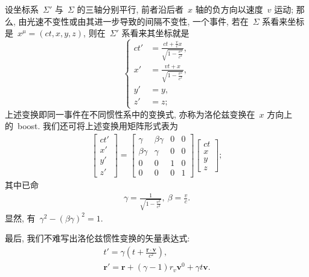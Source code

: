 设坐标系~$\Sigma'$ 与~$\Sigma$ 的三轴分别平行, 前者沿后者~$x$ 轴的负方向以速度~$v$ 运动; 那么, 由光速不变性或由其进一步导致的间隔不变性, 一个事件, 若在~$\Sigma$ 系看来坐标是~$x^\mu=(ct, x, y, z)$, 则在~$\Sigma'$ 系看来其坐标就是
\begin{equation}
\left\{
\begin{aligned}
ct'&=\frac{ct+\frac{v}{c}x}{\sqrt{1-\frac{v^2}{c^2}}},\\
x'&=\frac{vt+x}{\sqrt{1-\frac{v^2}{c^2}}},\\
y'&=y,\\
z'&=z;
\end{aligned}
\right.
\end{equation}
上述变换即同一事件在不同惯性系中的变换式, 亦称为洛伦兹变换在~$x$ 方向上的~boost. 我们还可将上述变换用矩阵形式表为
\begin{align}
\left[
\begin{array}{l}
ct'\\x'\\y'\\z'
\end{array}
\right]=
\left[
\begin{array}{cccc}
\gamma&\beta\gamma&0&0\\
\beta\gamma&\gamma&0&0\\
0&0&1&0\\
0&0&0&1
\end{array}
\right]
\left[
\begin{array}{l}
ct\\x\\y\\z
\end{array}
\right];
\end{align}
其中已命
\begin{align}
\gamma=\frac{1}{\sqrt{1-\frac{v^2}{c^2}}},~\beta=\frac{v}{c}.
\end{align}
显然, 有~$\gamma^2-(\beta\gamma)^2=1$.



最后, 我们不难写出洛伦兹惯性变换的矢量表达式:
\begin{gather}
t'=\gamma\left(t+\frac{\bm{r}\cdot\bm{v}}{c^2}\right),\\
\bm{r}'=\bm{r}+(\gamma-1)r_v\bm{v}^0+\gamma t\bm{v}.
\end{gather}

